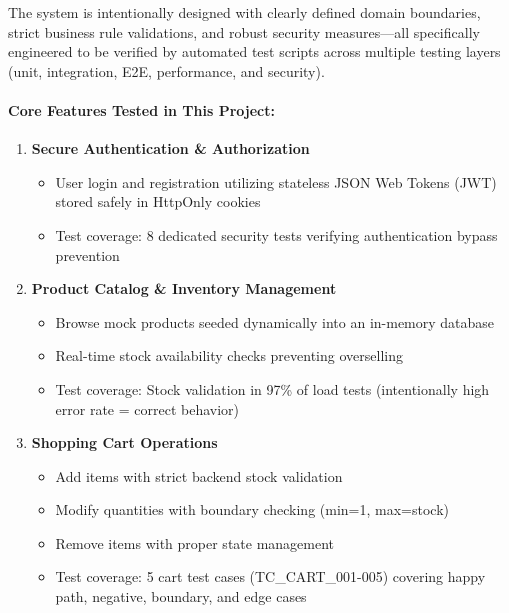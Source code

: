 \documentclass[11pt,a4paper]{article}
\begin{document}
The system is intentionally designed with clearly defined domain boundaries, strict business rule validations, and robust security measures—all specifically engineered to be verified by automated test scripts across multiple testing layers (unit, integration, E2E, performance, and security).

\paragraph{Core Features Tested in This Project:}

\begin{enumerate}
    \item \textbf{Secure Authentication \& Authorization}
    \begin{itemize}
        \item User login and registration utilizing stateless JSON Web Tokens (JWT) stored safely in HttpOnly cookies
        \item Test coverage: 8 dedicated security tests verifying authentication bypass prevention
    \end{itemize}

    \item \textbf{Product Catalog \& Inventory Management}
    \begin{itemize}
        \item Browse mock products seeded dynamically into an in-memory database
        \item Real-time stock availability checks preventing overselling
        \item Test coverage: Stock validation in 97\% of load tests (intentionally high error rate = correct behavior)
    \end{itemize}

    \item \textbf{Shopping Cart Operations}
    \begin{itemize}
        \item Add items with strict backend stock validation
        \item Modify quantities with boundary checking (min=1, max=stock)
        \item Remove items with proper state management
        \item Test coverage: 5 cart test cases (TC\_CART\_001-005) covering happy path, negative, boundary, and edge cases
    \end{itemize}


\end{enumerate}
\end{document}
